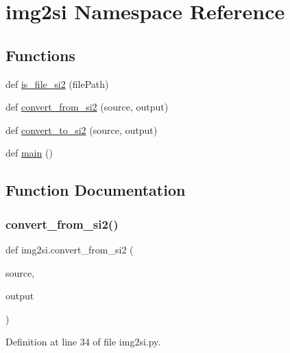 \hypertarget{namespaceimg2si}{}\section{img2si Namespace Reference}
\label{namespaceimg2si}
\subsection*{Functions}
\begin{DoxyCompactItemize}
\item 
def \hyperlink{namespaceimg2si_a30df945259118023030181e530c9f6df}{is\+\_\+file\+\_\+si2} (file\+Path)
\item 
def \hyperlink{namespaceimg2si_a7c848960474f9c9e4beab3df12fb5e64}{convert\+\_\+from\+\_\+si2} (source, output)
\item 
def \hyperlink{namespaceimg2si_a792ee72a74ed7abaf28cb4cc1d46869c}{convert\+\_\+to\+\_\+si2} (source, output)
\item 
def \hyperlink{namespaceimg2si_a87146d74b97186b359e4b3572eaec249}{main} ()
\end{DoxyCompactItemize}


\subsection{Function Documentation}
\mbox{\label{namespaceimg2si_a7c848960474f9c9e4beab3df12fb5e64}} 
\subsubsection{\texorpdfstring{convert\+\_\+from\+\_\+si2()}{convert\_from\_si2()}}
{\footnotesize\ttfamily def img2si.\+convert\+\_\+from\+\_\+si2 (\begin{DoxyParamCaption}\item[{}]{source,  }\item[{}]{output }\end{DoxyParamCaption})}



Definition at line 34 of file img2si.\+py.

